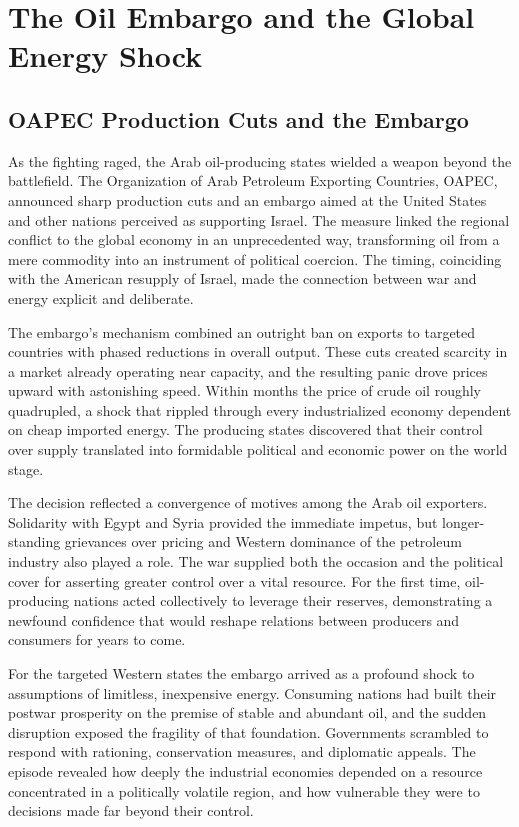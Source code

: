 \section{The Oil Embargo and the Global Energy Shock}

\subsection{OAPEC Production Cuts and the Embargo}
As the fighting raged, the Arab oil-producing states wielded a weapon beyond the battlefield. The Organization of Arab Petroleum Exporting Countries, OAPEC, announced sharp production cuts and an embargo aimed at the United States and other nations perceived as supporting Israel. The measure linked the regional conflict to the global economy in an unprecedented way, transforming oil from a mere commodity into an instrument of political coercion. The timing, coinciding with the American resupply of Israel, made the connection between war and energy explicit and deliberate.

The embargo's mechanism combined an outright ban on exports to targeted countries with phased reductions in overall output. These cuts created scarcity in a market already operating near capacity, and the resulting panic drove prices upward with astonishing speed. Within months the price of crude oil roughly quadrupled, a shock that rippled through every industrialized economy dependent on cheap imported energy. The producing states discovered that their control over supply translated into formidable political and economic power on the world stage.

The decision reflected a convergence of motives among the Arab oil exporters. Solidarity with Egypt and Syria provided the immediate impetus, but longer-standing grievances over pricing and Western dominance of the petroleum industry also played a role. The war supplied both the occasion and the political cover for asserting greater control over a vital resource. For the first time, oil-producing nations acted collectively to leverage their reserves, demonstrating a newfound confidence that would reshape relations between producers and consumers for years to come.

For the targeted Western states the embargo arrived as a profound shock to assumptions of limitless, inexpensive energy. Consuming nations had built their postwar prosperity on the premise of stable and abundant oil, and the sudden disruption exposed the fragility of that foundation. Governments scrambled to respond with rationing, conservation measures, and diplomatic appeals. The episode revealed how deeply the industrial economies depended on a resource concentrated in a politically volatile region, and how vulnerable they were to decisions made far beyond their control.

